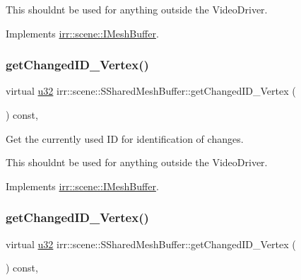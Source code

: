 This shouldn\textquotesingle{}t be used for anything outside the Video\+Driver. 

Implements \hyperlink{classirr_1_1scene_1_1IMeshBuffer_acc389d76856dfb06c3ba45a92315e6d8}{irr\+::scene\+::\+I\+Mesh\+Buffer}.

\mbox{\label{structirr_1_1scene_1_1SSharedMeshBuffer_ad9c7307fcad8c9b8db3db98f95863196}} 
\subsubsection{\texorpdfstring{get\+Changed\+I\+D\+\_\+\+Vertex()}{getChangedID\_Vertex()}\hspace{0.1cm}{\footnotesize\ttfamily [1/2]}}
{\footnotesize\ttfamily virtual \hyperlink{namespaceirr_a0416a53257075833e7002efd0a18e804}{u32} irr\+::scene\+::\+S\+Shared\+Mesh\+Buffer\+::get\+Changed\+I\+D\+\_\+\+Vertex (\begin{DoxyParamCaption}{ }\end{DoxyParamCaption}) const\hspace{0.3cm}{\ttfamily [inline]}, {\ttfamily [virtual]}}



Get the currently used ID for identification of changes. 

This shouldn\textquotesingle{}t be used for anything outside the Video\+Driver. 

Implements \hyperlink{classirr_1_1scene_1_1IMeshBuffer_aba48df31edf92a0117692c0be02298db}{irr\+::scene\+::\+I\+Mesh\+Buffer}.

\mbox{\label{structirr_1_1scene_1_1SSharedMeshBuffer_ad9c7307fcad8c9b8db3db98f95863196}} 
\subsubsection{\texorpdfstring{get\+Changed\+I\+D\+\_\+\+Vertex()}{getChangedID\_Vertex()}\hspace{0.1cm}{\footnotesize\ttfamily [2/2]}}
{\footnotesize\ttfamily virtual \hyperlink{namespaceirr_a0416a53257075833e7002efd0a18e804}{u32} irr\+::scene\+::\+S\+Shared\+Mesh\+Buffer\+::get\+Changed\+I\+D\+\_\+\+Vertex (\begin{DoxyParamCaption}{ }\end{DoxyParamCaption}) const\hspace{0.3cm}{\ttfamily [inline]}, {\ttfamily [virtual]}}



